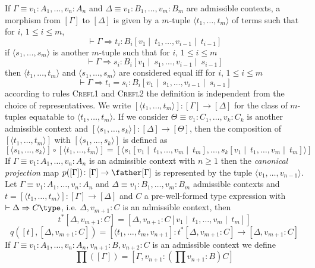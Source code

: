 If $\Gamma \equiv v_1 \colon A_1, \dots, v_n \colon A_n$ and $\Delta \equiv v_1 \colon B_1, \dots, v_m \colon B_m$
are admissible contexts, a morphism from $[\Gamma]$ to $[\Delta]$ is given by a $m$-tuple $\langle t_1, \dots, t_m \rangle$
of terms such that for $i$, $1 \leq i \leq m$, 
\[
   \vdash \Gamma \Rightarrow t_i : B_i[v_1 \mid\ t_1, \dots, v_{i-1} \mid\ t_{i-1}]
\]
if $\langle s_1, \dots, s_m \rangle$ is another $m$-tuple such that for  $i$, $1 \leq i \leq m$
\[
    \vdash \Gamma \Rightarrow s_i : B_i[v_1 \mid\ s_1, \dots, v_{i-1} \mid\ s_{i-1}]
\]
then $\langle t_1, \dots, t_m \rangle$ and $\langle s_1, \dots, s_m \rangle$ are considered equal
iff for $i$, $1 \leq i \leq m$
\[
    \vdash \Gamma \Rightarrow t_i = s_i : B_i[v_1 \mid\ s_1, \dots, v_{i-1} \mid\ s_{i-1}]
\]
according to rules \textsc{Crefl1} and \textsc{Crefl2} the definition is independent from the choice of representatives.
We write $[\langle t_1, \dots, t_m \rangle] : [\Gamma] \to [\Delta]$ for the class of $m$-tuples equatable to $\langle t_1, \dots, t_m \rangle$.
If we consider $\Theta \equiv v_1 \colon C_1, \dots, v_k \colon C_k$ is another admissible context and 
$[\langle s_1, \dots, s_k\rangle]: [\Delta] \to [\Theta]$, then the composition of $[\langle t_1, \dots, t_m \rangle]$
with $[\langle s_1, \dots, s_k \rangle]$ is defined as
\[
    [\langle s_1, \dots, s_k \rangle] 
    \circ 
    [\langle t_1, \dots, t_m \rangle] 
    = 
    [\langle 
        s_1[v_1 \mid\ t_1, \dots, v_m \mid\ t_m],
        \dots,
        s_k[v_1 \mid\ t_1, \dots, v_m \mid\ t_m]
    \rangle]
\]
If $\Gamma \equiv v_1 \colon A_1, \dots, v_n \colon A_n$ is an admissible context with $n \geq 1$ then the \textit{canonical projection}
map $p([\Gamma])\colon [\Gamma] \to \father [\Gamma]$ is represented by the tuple $\langle v_1, \dots, v_{n-1} \rangle$.
Let $\Gamma \equiv v_1 \colon A_1, \dots, v_n \colon A_n$ and $\Delta \equiv v_1 \colon B_1, \dots, v_m \colon B_m$ 
admissible contexts and $t = [\langle t_1, \dots, t_m \rangle] \colon [\Gamma] \to [\Delta]$ and 
$C$ a pre-well-formed type expression with $\vdash \Delta \Rightarrow C \type$, i.e. $\Delta, v_{m+1} \colon C$ is
an admissible context, then 
\[
    t^*[\Delta, v_{m+1} \colon C] = [\Delta, v_{n+1} \colon C[v_1 \mid\ t_1, \dots, v_m \mid\ t_m]]
\]
\[
    q([t], [\Delta, v_{m+1} \colon C]) = [\langle t_1, \dots, t_m, v_{n+1}] \colon t^*[\Delta, v_{m+1} \colon C] \to [\Delta, v_{m+1} \colon C]
\]
If $\Gamma \equiv v_1 \colon A_1, \dots, v_n \colon A_n, v_{n+1} \colon B, v_{n+2} \colon C$ is an admissible context
we define 
\[
    \prod([\Gamma]) = [\Gamma, v_{n+1} \colon (\prod v_{n+1} \colon B) C]
\]
